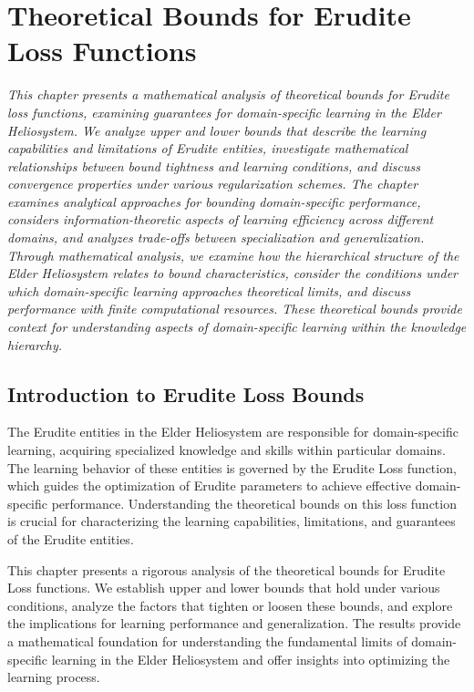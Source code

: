 \chapter{Theoretical Bounds for Erudite Loss Functions}

\textit{This chapter presents a mathematical analysis of theoretical bounds for Erudite loss functions, examining guarantees for domain-specific learning in the Elder Heliosystem. We analyze upper and lower bounds that describe the learning capabilities and limitations of Erudite entities, investigate mathematical relationships between bound tightness and learning conditions, and discuss convergence properties under various regularization schemes. The chapter examines analytical approaches for bounding domain-specific performance, considers information-theoretic aspects of learning efficiency across different domains, and analyzes trade-offs between specialization and generalization. Through mathematical analysis, we examine how the hierarchical structure of the Elder Heliosystem relates to bound characteristics, consider the conditions under which domain-specific learning approaches theoretical limits, and discuss performance with finite computational resources. These theoretical bounds provide context for understanding aspects of domain-specific learning within the knowledge hierarchy.}

\section{Introduction to Erudite Loss Bounds}

The Erudite entities in the Elder Heliosystem are responsible for domain-specific learning, acquiring specialized knowledge and skills within particular domains. The learning behavior of these entities is governed by the Erudite Loss function, which guides the optimization of Erudite parameters to achieve effective domain-specific performance. Understanding the theoretical bounds on this loss function is crucial for characterizing the learning capabilities, limitations, and guarantees of the Erudite entities.

This chapter presents a rigorous analysis of the theoretical bounds for Erudite Loss functions. We establish upper and lower bounds that hold under various conditions, analyze the factors that tighten or loosen these bounds, and explore the implications for learning performance and generalization. The results provide a mathematical foundation for understanding the fundamental limits of domain-specific learning in the Elder Heliosystem and offer insights into optimizing the learning process.

